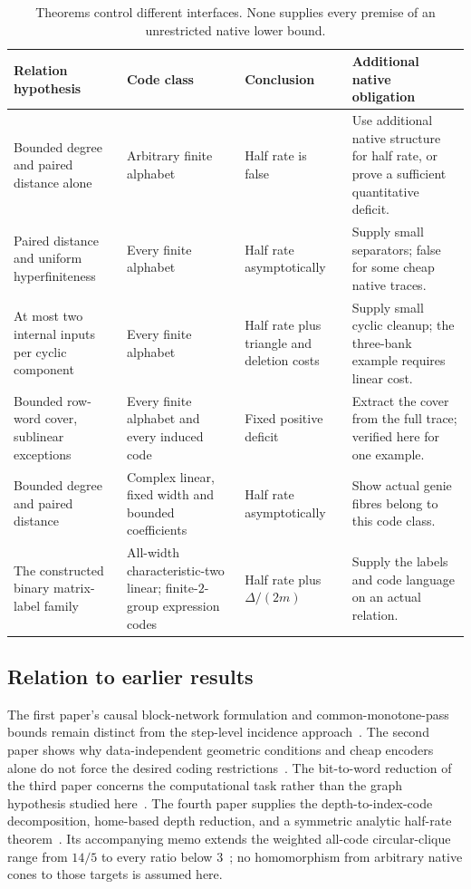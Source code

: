 \begin{table}[htbp]
\centering\small
\begin{tabular}{@{}>{\raggedright\arraybackslash}p{3.2cm}>{\raggedright\arraybackslash}p{3.1cm}>{\raggedright\arraybackslash}p{2.5cm}>{\raggedright\arraybackslash}p{5.6cm}@{}}
\toprule
Relation hypothesis & Code class & Conclusion & Additional native obligation \\
\midrule
Bounded degree and paired distance alone & Arbitrary finite alphabet & Half rate is false~\cite{StorageCodes2026} & Use additional native structure for half rate, or prove a sufficient quantitative deficit. \\[4pt]
Paired distance and uniform hyperfiniteness & Every finite alphabet & Half rate asymptotically & Supply small separators; false for some cheap native traces. \\[4pt]
At most two internal inputs per cyclic component & Every finite alphabet & Half rate plus triangle and deletion costs & Supply small cyclic cleanup; the three-bank example requires linear cost. \\[4pt]
Bounded row-word cover, sublinear exceptions & Every finite alphabet and every induced code & Fixed positive deficit & Extract the cover from the full trace; verified here for one example. \\[4pt]
Bounded degree and paired distance & Complex linear, fixed width and bounded coefficients & Half rate asymptotically & Show actual genie fibres belong to this code class. \\[4pt]
The constructed binary matrix-label family & All-width characteristic-two linear; finite-$2$-group expression codes & Half rate plus $\Delta/(2m)$ & Supply the labels and code language on an actual relation. \\
\bottomrule
\end{tabular}
\caption{Theorems control different interfaces. None supplies every premise of an unrestricted native lower bound.}
\label{tab:regimes}
\end{table}

\subsection{Relation to earlier results}
The first paper's causal block-network formulation and common-monotone-pass bounds remain distinct from the step-level incidence approach~\cite{BrendeTapeCoding}. The second paper shows why data-independent geometric conditions and cheap encoders alone do not force the desired coding restrictions~\cite{BrendeLocalCoding}. The bit-to-word reduction of the third paper concerns the computational task rather than the graph hypothesis studied here~\cite{BrendeBitWord}. The fourth paper supplies the depth-to-index-code decomposition, home-based depth reduction, and a symmetric analytic half-rate theorem~\cite{BrendeCurved}. Its accompanying memo extends the weighted all-code circular-clique range from $14/5$ to every ratio below $3$~\cite{BrendeCircularMemo}; no homomorphism from arbitrary native cones to those targets is assumed here.

